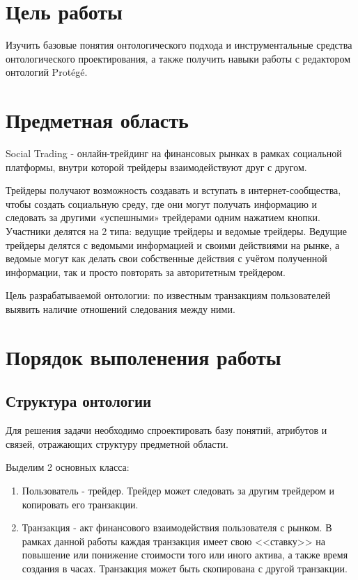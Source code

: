 	\section{Цель работы}
		Изучить базовые понятия онтологического подхода и инструментальные средства онтологического проектирования, а также получить навыки работы с редактором онтологий Protégé.
		
	\section{Предметная область}
		Social Trading - онлайн-трейдинг на финансовых рынках в рамках социальной платформы, внутри которой трейдеры взаимодействуют друг с другом.
		
		Трейдеры получают возможность создавать и вступать в интернет-сообщества, чтобы создать социальную среду, где они могут получать информацию и следовать за другими «успешными» трейдерами одним нажатием кнопки. Участники делятся на 2 типа: ведущие трейдеры и ведомые трейдеры. Ведущие трейдеры делятся с ведомыми информацией и своими действиями на рынке, а ведомые могут как делать свои собственные действия с учётом полученной информации, так и просто повторять за авторитетным трейдером. 
		
		Цель разрабатываемой онтологии: по известным транзакциям пользователей выявить наличие отношений следования между ними.
		
	\newpage
	\section{Порядок выполенения работы}
		\subsection{Структура онтологии}
			Для решения задачи необходимо спроектировать базу понятий, атрибутов и связей, отражающих структуру предметной области. 
			
			Выделим 2 основных класса:
			\begin{enumerate}
				\item Пользователь - трейдер. Трейдер может следовать за другим трейдером и копировать его транзакции. 
				\item Транзакция - акт финансового взаимодействия пользователя с рынком. В рамках данной работы каждая транзакция имеет свою <<ставку>> на повышение или понижение стоимости того или иного актива, а также время создания в часах.
				Транзакция может быть скопирована с другой транзакции.
			\end{enumerate}
		
